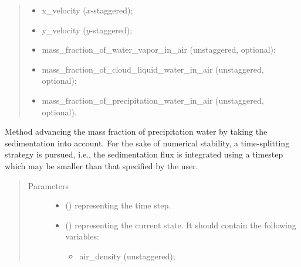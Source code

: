 \documentclass[letterpaper,10pt,english]{sphinxmanual}
\begin{document}
\begin{fulllineitems}
\begin{fulllineitems}
\begin{quote}
\begin{description}
\begin{itemize}
\begin{itemize}
\item {} 
x\_velocity (\(x\)-staggered);

\item {} 
y\_velocity (\(y\)-staggered);

\item {} 
mass\_fraction\_of\_water\_vapor\_in\_air (unstaggered, optional);

\item {} 
mass\_fraction\_of\_cloud\_liquid\_water\_in\_air (unstaggered, optional);

\item {} 
mass\_fraction\_of\_precipitation\_water\_in\_air (unstaggered, optional).

\end{itemize}


\end{itemize}

\end{description}\end{quote}

\end{fulllineitems}


\begin{fulllineitems}
\label{\detokenize{api:tasmania.dycore.prognostic_isentropic_nonconservative_centered.PrognosticIsentropicNonconservativeCentered.step_integrating_sedimentation_flux}}
Method advancing the mass fraction of precipitation water by taking the sedimentation into account.
For the sake of numerical stability, a time-splitting strategy is pursued, i.e., the sedimentation flux
is integrated using a timestep which may be smaller than that specified by the user.
\begin{quote}\begin{description}
\item[{Parameters}] \leavevmode\begin{itemize}
\item {} 
 () \textendash{}  representing the time step.

\item {} 
 () \textendash{} 
{\hyperref[\detokenize{api:tasmania.storages.state_isentropic.StateIsentropic}]{}} representing the current state.
It should contain the following variables:
\begin{itemize}
\item {} 
air\_density (unstaggered);


\end{itemize}
\end{itemize}
\end{description}
\end{quote}
\end{fulllineitems}
\end{fulllineitems}
\end{document}
